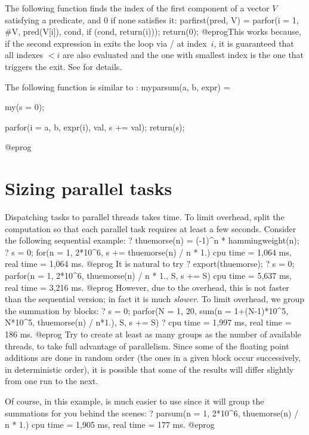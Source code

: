 The following function finds the index of the first component of a vector
$V$ satisfying a predicate, and $0$ if none satisfies it:
\bprog
parfirst(pred, V) =
{
  parfor(i = 1, #V,
    pred(V[i]),
    cond,
    if (cond, return(i)));
  return(0);
}
@eprog\noindent This works because, if the second expression
in  exits the loop via  /  at index~$i$,
it is guaranteed that all indexes $< i$ are also evaluated and the one with
smallest index is the one that triggers the exit. See  for
details.

The following function is similar to :
\bprog
myparsum(a, b, expr) =
{ my(s = 0);

  parfor(i = a, b,
    expr(i),
    val,
    s += val);
  return(s);
}
@eprog

\section{Sizing parallel tasks}

Dispatching tasks to parallel threads takes time. To limit overhead, split
the computation so that each parallel task requires at least a few
seconds. Consider the following sequential example:
\bprog
  ? thuemorse(n) = (-1)^n * hammingweight(n);
  ? s = 0; for(n = 1, 2*10^6, s += thuemorse(n) / n * 1.)
  cpu time = 1,064 ms, real time = 1,064 ms.
@eprog\noindent
It is natural to try
\bprog
  ? export(thuemorse);
  ? s = 0; parfor(n = 1, 2*10^6, thuemorse(n) / n * 1., S, s += S)
  cpu time = 5,637 ms, real time = 3,216 ms.
@eprog\noindent
However, due to the overhead, this is not faster than the sequential
version; in fact it is much \emph{slower}. To limit overhead, we group
the summation by blocks:
\bprog
  ? s = 0; parfor(N = 1, 20, sum(n = 1+(N-1)*10^5, N*10^5,
                                 thuemorse(n) / n*1.), S, s += S)
  ? cpu time = 1,997 ms, real time = 186 ms.
@eprog\noindent
Try to create at least as many groups as the number of available threads,
to take full advantage of parallelism. Since some of the floating point
additions are done in random order (the ones in a given block occur
successively, in deterministic order), it is possible that some of the
results will differ slightly from one run to the next.

Of course, in this example,  is much easier to use since it will
group the summations for you behind the scenes:
\bprog
  ? parsum(n = 1, 2*10^6, thuemorse(n) / n * 1.)
  cpu time = 1,905 ms, real time = 177 ms.
@eprog

